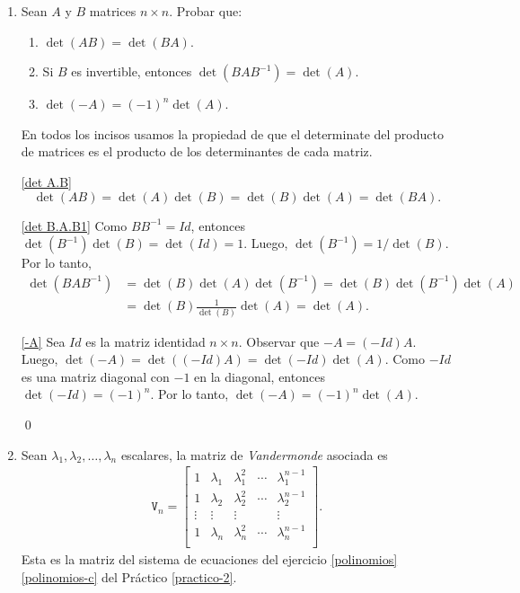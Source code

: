 \begin{enumerate}[topsep=6pt,itemsep=.4cm]
    \item Sean $A$ y  $B$ matrices $n \times n$. Probar que:
    \begin{enumerate}
        \item\label{det A.B} $\det(AB) = \det (BA)$.
        \item\label{det B.A.B1} Si $B$ es invertible, entonces $\det(B A B^{-1}) = \det (A)$.
        \item\label{-A} $\det(-A) = (-1)^n\det (A)$.
    \end{enumerate} 
    \rta En todos los incisos usamos la propiedad de que el determinate del producto de matrices es el producto de los determinantes de cada matriz.


    \ref{det A.B} 
    $$
    \det(AB) = \det(A)\det(B) = \det(B)\det(A) = \det(BA).
    $$

    \ref{det B.A.B1} Como $BB^{-1} = Id$, entonces $\det(B^{-1})\det(B) = \det(Id) = 1$. Luego, $\det(B^{-1}) = 1/\det(B)$. Por lo tanto,
    \begin{align*}
        \det(B A B^{-1}) &= \det(B)\det(A)\det(B^{-1}) = \det(B)\det(B^{-1})\det(A)\\ &=  \det(B)\frac1{\det(B)}\det(A)=\det(A).
    \end{align*}
    

    \ref{-A} Sea $Id$ es la matriz identidad $n \times n$. Observar que $-A = (-Id)A$. Luego, $\det(-A) = \det((-Id)A) = \det(-Id)\det(A)$. Como $-Id$ es una matriz diagonal con $-1$ en la diagonal, entonces $\det(-Id) = (-1)^n$. Por lo tanto, $\det(-A) = (-1)^n\det(A)$.

    \qed
    
    \item\label{vandermonde} Sean $\lambda_1, \lambda_2, \dots, \lambda_n$ escalares, la matriz de \emph{Vandermonde} asociada es
    \begin{align*}
    \mathtt V_n = \begin{bmatrix}
    1 & \lambda_1 & \lambda_1^2 & \cdots & \lambda_1^{n-1}\\
    1 & \lambda_2 & \lambda_2^2 & \cdots & \lambda_2^{n-1}\\
    \vdots &\vdots &\vdots & &\vdots\\
    1 & \lambda_n & \lambda_n^2 & \cdots & \lambda_n^{n-1}\\
    \end{bmatrix}.
    \end{align*}
    Esta es la matriz del sistema de ecuaciones del ejercicio \ref{polinomios}\,\ref{polinomios-c} del Práctico \ref{practico-2}.
    

\end{enumerate}
